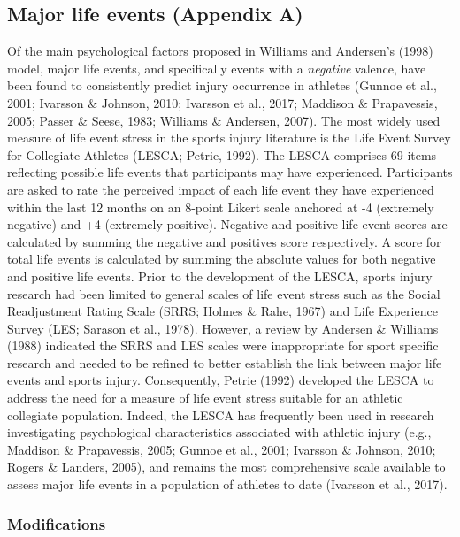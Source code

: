 \documentclass[
  english,
  man,floatsintext]{apa6}
\begin{document}
\hypertarget{major-life-events-appendix-a}{%
\subsection{Major life events (Appendix A)}\label{major-life-events-appendix-a}}

Of the main psychological factors proposed in Williams and Andersen's (1998) model, major life events, and specifically events with a \emph{negative} valence, have been found to consistently predict injury occurrence in athletes (Gunnoe et al., 2001; Ivarsson \& Johnson, 2010; Ivarsson et al., 2017; Maddison \& Prapavessis, 2005; Passer \& Seese, 1983; Williams \& Andersen, 2007).
The most widely used measure of life event stress in the sports injury literature is the Life Event Survey for Collegiate Athletes (LESCA; Petrie, 1992).
The LESCA comprises 69 items reflecting possible life events that participants may have experienced.
Participants are asked to rate the perceived impact of each life event they have experienced within the last 12 months on an 8-point Likert scale anchored at -4 (extremely negative) and +4 (extremely positive).
Negative and positive life event scores are calculated by summing the negative and positives score respectively.
A score for total life events is calculated by summing the absolute values for both negative and positive life events.
Prior to the development of the LESCA, sports injury research had been limited to general scales of life event stress such as the Social Readjustment Rating Scale (SRRS; Holmes \& Rahe, 1967) and Life Experience Survey (LES; Sarason et al., 1978).
However, a review by Andersen \& Williams (1988) indicated the SRRS and LES scales were inappropriate for sport specific research and needed to be refined to better establish the link between major life events and sports injury.
Consequently, Petrie (1992) developed the LESCA to address the need for a measure of life event stress suitable for an athletic collegiate population.
Indeed, the LESCA has frequently been used in research investigating psychological characteristics associated with athletic injury (e.g., Maddison \& Prapavessis, 2005; Gunnoe et al., 2001; Ivarsson \& Johnson, 2010; Rogers \& Landers, 2005), and remains the most comprehensive scale available to assess major life events in a population of athletes to date (Ivarsson et al., 2017).

\hypertarget{modifications}{%
\subsubsection{Modifications}\label{modifications}}
\end{document}
